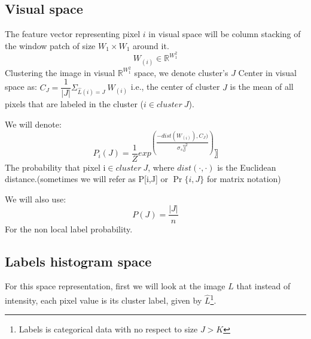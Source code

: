 \documentclass{article}
\begin{document}
\subsection{Visual space}
The feature vector representing pixel $ i $ in visual space will be column stacking of the window patch of size $W_1\times W_1$ around it.
\begin{equation*}
W_{(i)}\in \mathbb{R}^{W_{1}^{2}}
\end{equation*}
Clustering the image in visual $ \mathbb{R}^{W_{1}^{2}} $ space, we denote cluster's $ J $
Center in visual space as:  $C_{J}=\dfrac{1}{|J|} \Sigma_{\widehat{L} (i)=J}~W_{(i)}$
i.e., the center of cluster $ J $ is the mean of all pixels that are labeled in the cluster ($i\in cluster~J$).

We will denote:
\begin{equation}
P_{i}(J) =\dfrac{1}{Z}exp^{(\dfrac{-dist(W_{(i)} ),C_J)}{\sigma_s〗^2})}〗\label{eq:pixelPr}
\end{equation} 
The probability that pixel i$\in cluster~J$,
where $ dist(\cdot,\cdot) $ is the Euclidean distance.(sometimes we will refer as P[i,J] or $ \Pr\{i,J\} $ for matrix notation)

We will also use:
\begin{equation}
P(J)=\frac {|J\vert}{n}
\end{equation} 
For the non local label probability.
\subsection{Labels histogram space}
For this space representation, first we will look at the image $ L $ that instead of intensity, each pixel value is its cluster label, given by $\hat L$\footnote{Labels is categorical data with no respect to size $ J>K $}.
\end{document}
